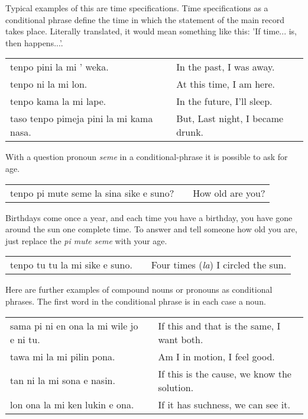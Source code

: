 Typical examples of this are time specifications.
Time specifications as a conditional phrase define the time in which the statement of the main record takes place.
Literally translated, it would mean something like this: 'If time... is, then happens...'.

\begin{supertabular}{p{5,5cm}|ll}
    tenpo pini la mi ' weka.                &  & In the past, I was away.         \\
    tenpo ni la mi lon.                     &  & At this time, I am here.         \\
    tenpo kama la mi lape.                  &  & In the future, I'll sleep.       \\
    taso tenpo pimeja pini la mi kama nasa. &  & But, Last night, I became drunk. \\
\end{supertabular}

With a question pronoun \textit{seme} in a conditional-phrase it is possible to ask for age.

\begin{supertabular}{p{5,5cm}|ll}
    tenpo pi mute seme la sina sike e suno? &  & How old are you? \\
\end{supertabular}

Birthdays come once a year, and each time you have a birthday, you have gone around the sun one complete time.
To answer and tell someone how old you are, just replace the \textit{pi mute seme} with your age.

\begin{supertabular}{p{5,5cm}|ll}
    tenpo tu tu la mi sike e suno. &  & Four times (\textit{la}) I circled the sun. \\
\end{supertabular}

Here are further examples of compound nouns or pronouns as conditional phrases.
The first word in the conditional phrase is in each case a noun.

\begin{supertabular}{p{5,5cm}|ll}
    sama pi ni en ona la mi wile jo e ni tu. &  & If this and that is the same, I want both.  \\
    tawa mi la mi pilin pona.                &  & Am I in motion, I feel good.                \\
    tan ni la mi sona e nasin.               &  & If this is the cause, we know the solution. \\
    lon ona la mi ken lukin e ona.           &  & If it has suchness, we can see it.          \\
\end{supertabular}

